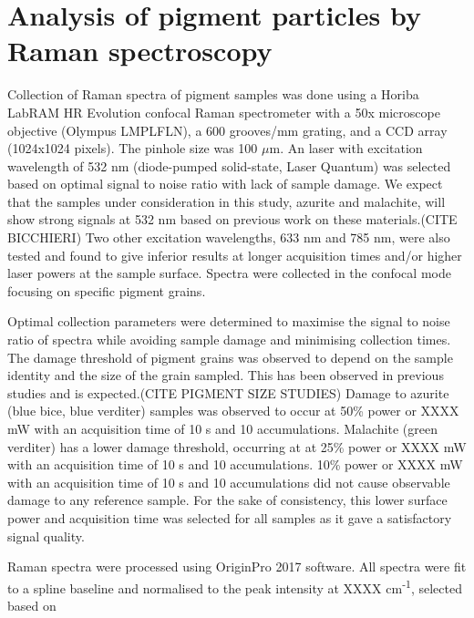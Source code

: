 \section[Analysis of pigment particles by Raman spectroscopy]{Analysis of pigment particles by Raman spectroscopy}
\label{section2.2}

Collection of Raman spectra of pigment samples was done using a Horiba LabRAM HR Evolution confocal Raman spectrometer with a 50x microscope objective (Olympus LMPLFLN), a 600 grooves/mm grating, and a CCD array (1024x1024 pixels). The pinhole size was 100 $\mu$m. An laser with excitation wavelength of 532 nm (diode-pumped solid-state, Laser Quantum) was selected based on optimal signal to noise ratio with lack of sample damage. We expect that the samples under consideration in this study, azurite and malachite, will show strong signals at 532 nm based on previous work on these materials.(CITE BICCHIERI) Two other excitation wavelengths, 633 nm and 785 nm, were also tested and found to give inferior results at longer acquisition times and/or higher laser powers at the sample surface. Spectra were collected in the confocal mode focusing on specific pigment grains.

Optimal collection parameters were determined to maximise the signal to noise ratio of spectra while avoiding sample damage and minimising collection times. The damage threshold of pigment grains was observed to depend on the sample identity and the size of the grain sampled. This has been observed in previous studies and is expected.(CITE PIGMENT SIZE STUDIES) Damage to azurite (blue bice, blue verditer) samples was observed to occur at 50\% power or XXXX mW with an acquisition time of 10 s and 10 accumulations. Malachite (green verditer) has a lower damage threshold, occurring at at 25\% power or XXXX mW with an acquisition time of 10 s and 10 accumulations. 10\% power or XXXX mW with an acquisition time of 10 s and 10 accumulations did not cause observable damage to any reference sample. For the sake of consistency, this lower surface power and acquisition time was selected for all samples as it gave a satisfactory signal quality. 


Raman spectra were processed using OriginPro 2017 software. All spectra were fit to a spline baseline and normalised to the peak intensity at XXXX cm\textsuperscript{-1}, selected based on 

